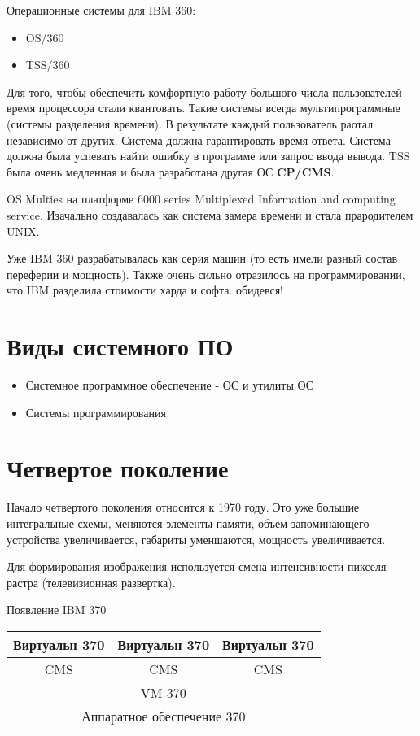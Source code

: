 \documentclass[a4paper, 14pt]{report}
\begin{document}
    Операционные системы для IBM 360:

    \begin{itemize}
        \item OS/360
        \item TSS/360
    \end{itemize}

    Для того, чтобы обеспечить комфортную работу большого числа пользователей время процессора стали квантовать. Такие системы всегда мультипрограммные (системы разделения времени). В результате каждый пользователь раотал независимо от других. Система должна гарантировать время ответа. Система должна была успевать найти ошибку в программе или запрос ввода вывода. TSS была очень медленная и была разработана другая ОС \textbf{CP/CMS}.

    OS Multies на платформе 6000 series Multiplexed Information and computing service. Изачально создавалась как система замера времени и стала прародителем UNIX.

    Уже IBM 360 разрабатывалась как серия машин (то есть имели разный состав переферии и мощность). Также очень сильно отразилось на программировании, что IBM разделила стоимости харда и софта. обидевся!

    \section{Виды системного ПО}

    \begin{itemize}
        \item Системное программное обеспечение - ОС и утилиты ОС
        \item Системы программирования
    \end{itemize}

    \section{Четвертое поколение}

    Начало четвертого поколения относится к 1970 году. Это уже большие интегральные схемы, меняются элементы памяти, объем запоминающего устройства увеличивается, габариты уменшаются, мощность увеличивается.

    Для формирования изображения используется смена интенсивности пикселя растра (телевизионная развертка).

    Появление IBM 370

    \begin{center}
        \begin{tabular}{|c|c|c|}
            \hline
            Виртуальн 370 & Виртуальн 370 & Виртуальн 370 \\
            \hline
            CMS & CMS & CMS \\
            \hline
            \multicolumn{3}{|c|}{VM 370} \\
            \hline
            \multicolumn{3}{|c|}{Аппаратное обеспечение 370} \\
            \hline
        \end{tabular}
    \end{center}
\end{document}
